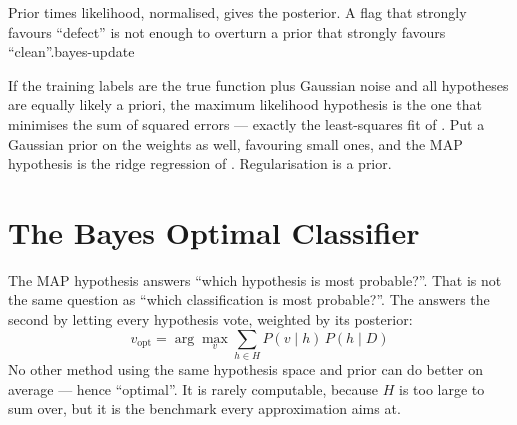 %
{Prior times likelihood, normalised, gives the posterior. A flag that strongly favours
``defect'' is not enough to overturn a prior that strongly favours ``clean''.}{bayes-update}

\begin{conceptbox}
If the training labels are the true function plus Gaussian noise and all
hypotheses are equally likely a priori, the maximum likelihood hypothesis is the
one that minimises the sum of squared errors --- exactly the least-squares fit of
. Put a Gaussian prior on the weights as well, favouring small
ones, and the MAP hypothesis is the ridge regression of .
Regularisation is a prior.
\end{conceptbox}

\section{The Bayes Optimal Classifier}

The MAP hypothesis answers ``which hypothesis is most probable?''. That is not the
same question as ``which classification is most probable?''. The  answers the second by letting every hypothesis vote, weighted by its
posterior:
\[
v_{\text{opt}} = \arg\max_{v} \sum_{h \in H} P(v \mid h)\,P(h \mid D)
\]
No other method using the same hypothesis space and prior can do better on
average --- hence ``optimal''. It is rarely computable, because $H$ is too large to
sum over, but it is the benchmark every approximation aims at.

